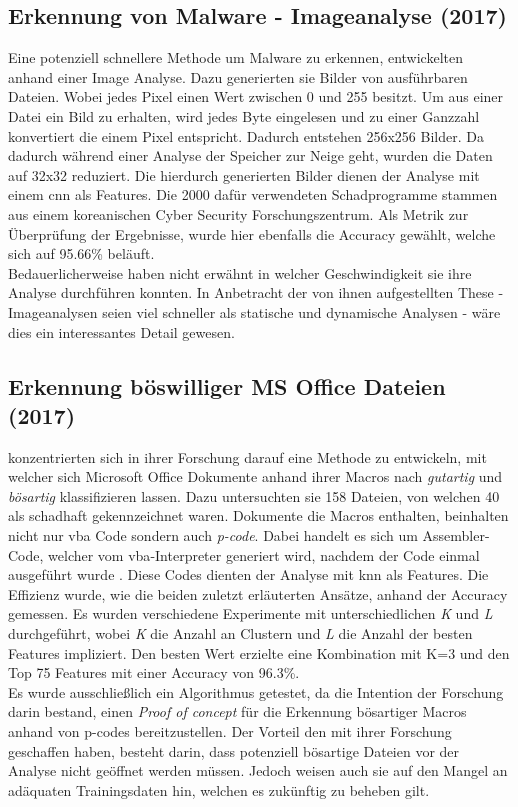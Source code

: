 \documentclass[
    12pt, %
    DIV10,
    ngerman, %
    a4paper, %
    oneside, %
    titlepage, %
    parskip=half, %
    headings=normal, %
    listof=totoc, %
    bibliography=totoc, %
    index=totoc, %
    captions=tableheading, %
    final %
]{scrreprt}
\begin{document}
\subsection{Erkennung von Malware - Imageanalyse (2017)}
Eine potenziell schnellere Methode um Malware zu erkennen, entwickelten \textcite{8190895} anhand einer Image Analyse. Dazu generierten sie Bilder von ausführbaren Dateien. Wobei jedes Pixel einen Wert zwischen 0 und 255 besitzt. Um aus einer Datei ein Bild zu erhalten, wird jedes Byte eingelesen und zu einer Ganzzahl konvertiert die einem Pixel entspricht. Dadurch entstehen 256x256 Bilder. Da dadurch während einer Analyse der Speicher zur Neige geht, wurden die Daten auf 32x32 reduziert. Die hierdurch generierten Bilder dienen der Analyse mit einem \ac{cnn} als Features. Die 2000 dafür verwendeten Schadprogramme stammen aus einem koreanischen Cyber Security Forschungszentrum. Als Metrik zur Überprüfung der Ergebnisse, wurde hier ebenfalls die Accuracy gewählt, welche sich auf 95.66\% beläuft.\\
Bedauerlicherweise haben \textcite{8190895} nicht erwähnt in welcher Geschwindigkeit sie ihre Analyse durchführen konnten. In Anbetracht der von ihnen aufgestellten These - Imageanalysen seien viel schneller als statische und dynamische Analysen - wäre dies ein interessantes Detail gewesen.

%
\subsection{Erkennung böswilliger MS Office Dateien (2017)}
\textcite{Bearden2018} konzentrierten sich in ihrer Forschung darauf eine Methode zu entwickeln, mit welcher sich Microsoft Office Dokumente anhand ihrer Macros nach \emph{gutartig} und \emph{bösartig} klassifizieren lassen. Dazu untersuchten sie 158 Dateien, von welchen 40 als schadhaft gekennzeichnet waren. Dokumente die Macros enthalten, beinhalten nicht nur \ac{vba} Code sondern auch \emph{p-code}. Dabei handelt es sich um Assembler-Code, welcher vom \ac{vba}-Interpreter generiert wird, nachdem der Code einmal ausgeführt wurde \parencite{Bearden2018}. Diese Codes dienten der Analyse mit \ac{knn} als Features. Die Effizienz wurde, wie die beiden zuletzt erläuterten Ansätze, anhand der Accuracy gemessen. Es wurden verschiedene Experimente mit unterschiedlichen \emph{K} und \emph{L} durchgeführt, wobei \emph{K} die Anzahl an Clustern und \emph{L} die Anzahl der besten Features impliziert. Den besten Wert erzielte eine Kombination mit K=3 und den Top 75 Features mit einer Accuracy von 96.3\%.\\Es wurde ausschlie{\ss}lich ein Algorithmus getestet, da die Intention der Forschung darin bestand, einen \emph{Proof of concept} für die Erkennung bösartiger Macros anhand von p-codes bereitzustellen. Der Vorteil den \textcite{Bearden2018} mit ihrer Forschung geschaffen haben, besteht darin, dass potenziell bösartige Dateien vor der Analyse nicht geöffnet werden müssen. Jedoch weisen auch sie auf den Mangel an adäquaten Trainingsdaten hin, welchen es zukünftig zu beheben gilt.
%
\end{document}
